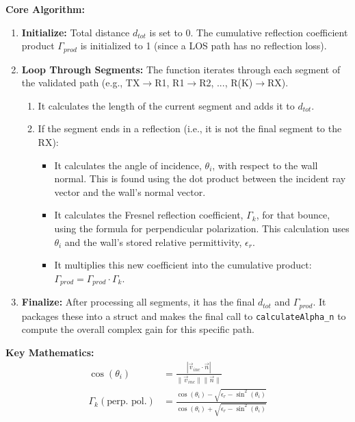 \documentclass{article}
\begin{document}
	\textbf{Core Algorithm:}
	\begin{enumerate}
		\item \textbf{Initialize:} Total distance $d_{tot}$ is set to 0. The cumulative reflection coefficient product $\Gamma_{prod}$ is initialized to 1 (since a LOS path has no reflection loss).
		\item \textbf{Loop Through Segments:} The function iterates through each segment of the validated path (e.g., TX$\rightarrow$R1, R1$\rightarrow$R2, ..., R(K)$\rightarrow$RX).
		\begin{enumerate}
			\item It calculates the length of the current segment and adds it to $d_{tot}$.
			\item If the segment ends in a reflection (i.e., it is not the final segment to the RX):
			\begin{itemize}
				\item It calculates the angle of incidence, $\theta_i$, with respect to the wall normal. This is found using the dot product between the incident ray vector and the wall's normal vector.
				\item It calculates the Fresnel reflection coefficient, $\Gamma_k$, for that bounce, using the formula for perpendicular polarization. This calculation uses $\theta_i$ and the wall's stored relative permittivity, $\epsilon_r$.
				\item It multiplies this new coefficient into the cumulative product: $\Gamma_{prod} = \Gamma_{prod} \cdot \Gamma_k$.
			\end{itemize}
		\end{enumerate}
		\item \textbf{Finalize:} After processing all segments, it has the final $d_{tot}$ and $\Gamma_{prod}$. It packages these into a struct and makes the final call to \texttt{calculateAlpha\_n} to compute the overall complex gain for this specific path.
	\end{enumerate}
	
	\textbf{Key Mathematics:}
	\begin{align*}
		\cos(\theta_i) &= \frac{|\vec{v}_{inc} \cdot \vec{n}|}{\|\vec{v}_{inc}\| \|\vec{n}\|} \\
		\Gamma_k (\text{perp. pol.}) &= \frac{\cos(\theta_i) - \sqrt{\epsilon_r - \sin^2(\theta_i)}}{\cos(\theta_i) + \sqrt{\epsilon_r - \sin^2(\theta_i)}}
	\end{align*}
	
	
	
\end{document}
